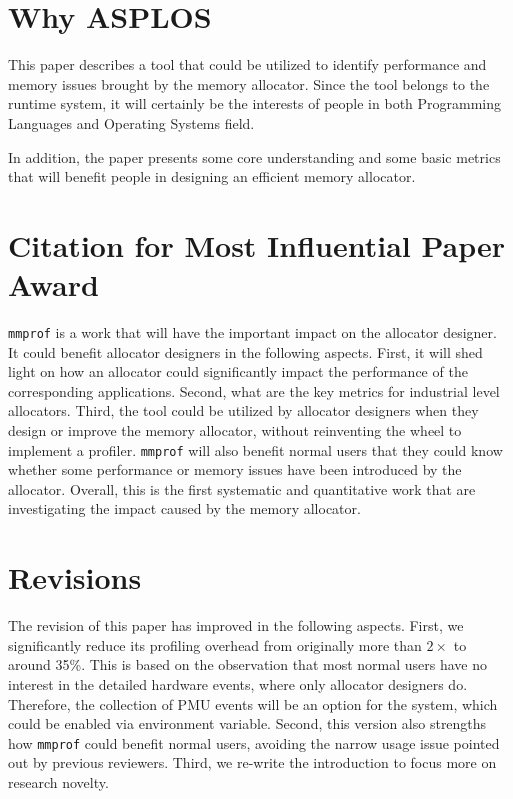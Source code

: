 \documentclass[pageno]{jpaper}
\newcommand{\MP}{\texttt{mmprof}}
\begin{document}
\section{Why ASPLOS}
\label{sec:why-asplos}

This paper describes a tool that could be utilized to identify performance and memory issues brought by the memory allocator. Since the tool belongs to the runtime system, it will certainly be the interests of people in both Programming Languages and Operating Systems field. 

In addition, the paper presents some core understanding and some basic metrics that will benefit people in designing an efficient memory allocator.

\section{Citation for Most Influential Paper Award}
\label{sec:citation}

\MP{} is a work that will have the important impact on the allocator designer. It could benefit allocator designers in the following aspects. First, it will shed light on how an allocator could significantly impact the performance of the corresponding applications. Second, what are the key metrics for industrial level allocators. Third, the tool could be utilized by allocator designers when they design or improve the memory allocator, without reinventing the wheel to implement a profiler. \MP{} will also benefit normal users that they could know whether some performance or memory issues have been introduced by the allocator. Overall, this is the first systematic and quantitative work that are investigating the impact caused by the memory allocator. 

\section{Revisions}
\label{sec:revisions}

The revision of this paper has improved in the following aspects. First, we significantly reduce its profiling overhead from originally more than $2\times$ to around 35\%. This is based on the observation that most normal users have no interest in the detailed hardware events, where only allocator designers do. Therefore, the collection of PMU events will be an option for the system, which could be enabled via environment variable. Second, this version also strengths how \MP{} could benefit normal users, avoiding the narrow usage issue pointed out by previous reviewers. Third, we re-write the introduction to focus more on research novelty. 
 
\pagebreak
{


}
\end{document}
